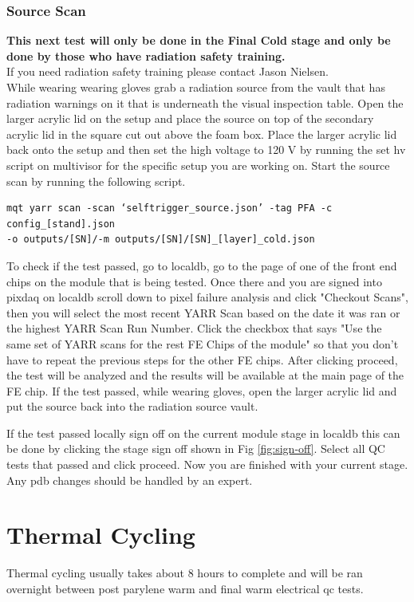 \documentclass[12pt]{article}
\begin{document}
\subsubsection{Source Scan}
\textbf{This next test will only be done in the Final Cold stage and only be done by those who have radiation safety training.}\\

If you need radiation safety training please contact Jason Nielsen. \\

While wearing wearing gloves grab a radiation source from the vault that has radiation warnings on it that is underneath the visual inspection table. Open the larger acrylic lid on the setup and place the source on top of the secondary acrylic lid in the square cut out above the foam box. Place the larger acrylic lid back onto the setup and then set the high voltage to 120 V by running the set hv script on multivisor for the specific setup you are working on. Start the source scan by running the following script. 

\begin{verbatim}
mqt yarr scan -scan ‘selftrigger_source.json’ -tag PFA -c config_[stand].json 
-o outputs/[SN]/-m outputs/[SN]/[SN]_[layer]_cold.json  
\end{verbatim}

To check if the test passed, go to localdb, go to the page of one of the front end chips on the module that is being tested. Once there and you are signed into pixdaq on localdb scroll down to pixel failure analysis and click "Checkout Scans", then you will select the most recent YARR Scan based on the date it was ran or the highest YARR Scan Run Number. Click the checkbox that says "Use the same set of YARR scans for the rest FE Chips of the module" so that you don't have to repeat the previous steps for the other FE chips. After clicking proceed, the test will be analyzed and the results will be available at the main page of the FE chip. If the test passed, while wearing gloves, open the larger acrylic lid and put the source back into the radiation source vault. 

If the test passed locally sign off on the current module stage in localdb this can be done by clicking the stage sign off shown in Fig \ref{fig:sign-off}. Select all QC tests that passed and click proceed. Now you are finished with your current stage. Any pdb changes should be handled by an expert. 

\newpage
\section{Thermal Cycling}
Thermal cycling usually takes about 8 hours to complete and will be ran overnight between post parylene warm and final warm electrical qc tests. 
\end{document}
